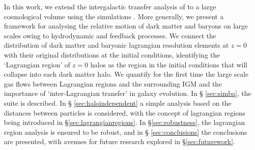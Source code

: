 In this work, we extend the intergalactic transfer analysis of
\citet{anglesalcazar2016} to a large cosmological volume using the \simba{}
simulations \citep{dave2018}. More generally, we present a framework for
analysing the relative motion of dark matter and baryons on large scales
owing to hydrodynamic and feedback processes. We connect the distribution of
dark matter and baryonic lagrangian resolution elements at $z=0$ with their
original distributions at the initial conditions, identifying the `Lagrangian
region' of $z=0$ halos as the region in the initial conditions that will
collapse into each dark matter halo. We quantify for the first time the large
scale gas flows between Lagrangian regions and the surrounding IGM and the
importance of `inter-Lagrangian transfer' in galaxy evolution. In \S
\ref{sec:simba}, the \simba{} suite is described. In \S
\ref{sec:haloindependent} a simple analysis based on the distances between
particles is considered, with the concept of lagrangian regions being
introduced in \S \ref{sec:lagrangianregions}. In \S \ref{sec:robustness}, the
lagrangian region analysis is ensured to be robust, and in \S
\ref{sec:conclusions} the conclusions are presented, with avenues for future
research explored in \S \ref{sec:futurework}.